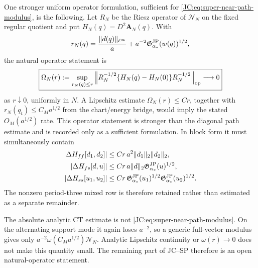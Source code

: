 \begin{contract}
One stronger uniform operator formulation, sufficient for
\eqref{JC:eq:super-near-path-modulus}, is the following.  Let $R_N$ be the Riesz operator of
$\mathcal N_N$ on the fixed regular quotient and put
$H_N(q)=D^2\mathbf A_N(q)$.  With
\[
 r_N(q)=\frac{\|d(q)\|_{\ell^\infty}}a
 +a^{-2}\mathfrak G^{\rm JP}_{\alpha_*}(w(q))^{1/2},
\]
the natural operator statement is
\begin{equation}\label{JC:eq:super-near-operator-modulus}
 \boxed{
 \Omega_N(r):=
 \sup_{r_N(q)\le r}
 \left\|R_N^{-1/2}
 \{H_N(q)-H_N(0)\}R_N^{-1/2}\right\|_{\rm op}
 \longrightarrow0}
\end{equation}
as $r\downarrow0$, uniformly in $N$.  A Lipschitz estimate
$\Omega_N(r)\le Cr$, together with
$r_N(q_t)\le C_Ma^{1/2}$ from the chart/energy bridge, would imply the
stated $O_M(a^{1/2})$ rate.  This operator statement is stronger than the
diagonal path estimate and is recorded only as a sufficient formulation.
In block
form it must simultaneously contain
\begin{align*}
 |\Delta H_{ff}[d_1,d_2]|
 &\le Cr\,a^2\|d_1\|_2\|d_2\|_2,\\
 |\Delta H_{fs}[d,u]|
 &\le Cr\,a\|d\|_2\mathfrak G^{\rm JP}_{\alpha_*}(u)^{1/2},\\
 |\Delta H_{ss}[u_1,u_2]|
 &\le Cr\,
 \mathfrak G^{\rm JP}_{\alpha_*}(u_1)^{1/2}
 \mathfrak G^{\rm JP}_{\alpha_*}(u_2)^{1/2}.
\end{align*}
The nonzero period-three mixed row is therefore retained rather than
estimated as a separate remainder.

The absolute analytic CT estimate is not
\eqref{JC:eq:super-near-path-modulus}.  On the alternating support mode it
again loses $a^{-2}$, so a generic full-vector modulus gives only
$a^{-2}\omega(C_Ma^{1/2})\mathcal N_N$.  Analytic Lipschitz continuity or
$\omega(r)\to0$ does not make this quantity small.  The remaining part of
JC--SP therefore is an open natural-operator statement.


\end{contract}

